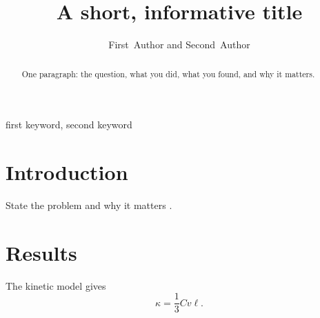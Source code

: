 \documentclass[journal]{IEEEtran}
\begin{document}
\title{A short, informative title}
\author{First~Author and Second~Author}
\maketitle

\begin{abstract}
One paragraph: the question, what you did, what you found, and why it matters.
\end{abstract}

\begin{IEEEkeywords}
first keyword, second keyword
\end{IEEEkeywords}

\section{Introduction}
State the problem and why it matters \cite{callaway1959}.

\section{Results}
The kinetic model gives
\begin{equation}
  \kappa = \frac{1}{3} C v \ell .
\end{equation}



\end{document}
